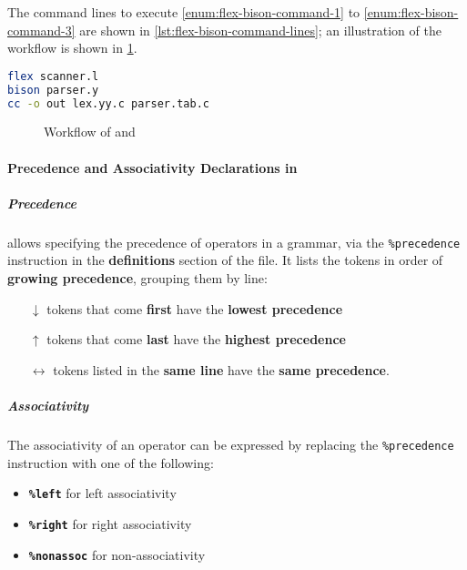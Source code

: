 \documentclass[english]{article}
\begin{document}
The command lines to execute \ref{enum:flex-bison-command-1} to \ref{enum:flex-bison-command-3} are shown in \ref{lst:flex-bison-command-lines}; an illustration of the workflow is shown in \ref{fig:flex-bison-workflow}.

\begin{onepage}
  \begin{lstlisting}[language=bash, caption={Command lines to execute \ref{enum:flex-bison-command-1} to \ref{enum:flex-bison-command-3}}, label={lst:flex-bison-command-lines}]
flex scanner.l
bison parser.y
cc -o out lex.yy.c parser.tab.c
\end{lstlisting}
\end{onepage}

\begin{figure}[htbp]
  \centering
  \bigskip
  \caption{Workflow of \flex and \bison}
  \label{fig:flex-bison-workflow}
  \bigskip
\end{figure}

\paragraph{Precedence and Associativity Declarations in \bison}

\subparagraph*{Precedence}
\bison allows specifying the precedence of operators in a grammar, via the \texttt{\%precedence} instruction in the \textbf{definitions} section of the file.
It lists the tokens in order of \textbf{growing precedence}, grouping them by line:

\begin{itemize}
  \item[\(\downarrow\)] tokens that come \textbf{first} have the \textbf{lowest precedence}
  \item[\(\uparrow\)] tokens that come \textbf{last} have the \textbf{highest precedence}
  \item[\(\leftrightarrow\)] tokens listed in the \textbf{same line} have the \textbf{same precedence}.
\end{itemize}

\subparagraph*{Associativity}
The associativity of an operator can be expressed by replacing the \texttt{\%precedence} instruction with one of the following:

\begin{itemize}[label=\textbf{\texttt{>}}]
  \item \textbf{\texttt{\%left}} for left associativity
  \item \textbf{\texttt{\%right}} for right associativity
  \item \textbf{\texttt{\%nonassoc}} for non-associativity
\end{itemize}
\end{document}
